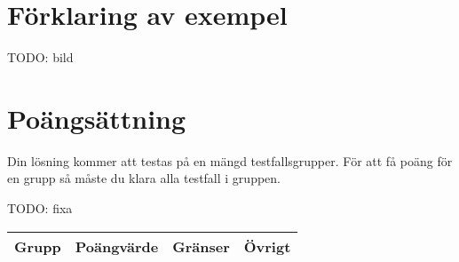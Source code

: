 \section*{Förklaring av exempel}

TODO: bild

\section*{Poängsättning}
Din lösning kommer att testas på en mängd testfallsgrupper. För att få poäng för en grupp
så måste du klara alla testfall i gruppen.

TODO: fixa


\begin{tabular}{| l | l | l | l |}
\hline
Grupp & Poängvärde & Gränser & Övrigt\\ \hline
\end{tabular}
